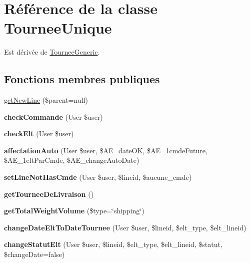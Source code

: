 \hypertarget{classTourneeUnique}{}\section{Référence de la classe Tournee\+Unique}
\label{classTourneeUnique}


Est dérivée de \hyperlink{classTourneeGeneric}{Tournee\+Generic}.

\subsection*{Fonctions membres publiques}
\begin{DoxyCompactItemize}
\item 
\hyperlink{classTourneeUnique_ad6b2fd79cbb1d2291e2574c26934c0b6}{get\+New\+Line} (\$parent=null)
\item 
\mbox{\label{classTourneeUnique_abb44213cdec7b38b3c2d06bea041b26a}} 
{\bfseries check\+Commande} (User \$user)
\item 
\mbox{\label{classTourneeUnique_aaf9c31d8785323300ddb1573f2888bdf}} 
{\bfseries check\+Elt} (User \$user)
\item 
\mbox{\label{classTourneeUnique_ae46b054e5a55fe56e9beafcdd232c287}} 
{\bfseries affectation\+Auto} (User \$user, \$A\+E\+\_\+date\+OK, \$A\+E\+\_\+1cmde\+Future, \$A\+E\+\_\+1elt\+Par\+Cmde, \$A\+E\+\_\+change\+Auto\+Date)
\item 
\mbox{\label{classTourneeUnique_ab6f5af6c4ca24c1b2d54149665668f47}} 
{\bfseries set\+Line\+Not\+Has\+Cmde} (User \$user, \$lineid, \$aucune\+\_\+cmde)
\item 
\mbox{\label{classTourneeUnique_a2a5383dd1cf51bd6cf9256826f986986}} 
{\bfseries get\+Tournee\+De\+Livraison} ()
\item 
\mbox{\label{classTourneeUnique_aacc841f516ccd280d0f5359c2cbcbb90}} 
{\bfseries get\+Total\+Weight\+Volume} (\$type=\char`\"{}shipping\char`\"{})
\item 
\mbox{\label{classTourneeUnique_af6b20d25ade3dc7152ef8f83f42d7968}} 
{\bfseries change\+Date\+Elt\+To\+Date\+Tournee} (User \$user, \$lineid, \$elt\+\_\+type, \$elt\+\_\+lineid)
\item 
\mbox{\label{classTourneeUnique_a30e28325f18f5e8c5f43a89b23680b99}} 
{\bfseries change\+Statut\+Elt} (User \$user, \$lineid, \$elt\+\_\+type, \$elt\+\_\+lineid, \$statut, \$change\+Date=false)
\end{DoxyCompactItemize}
